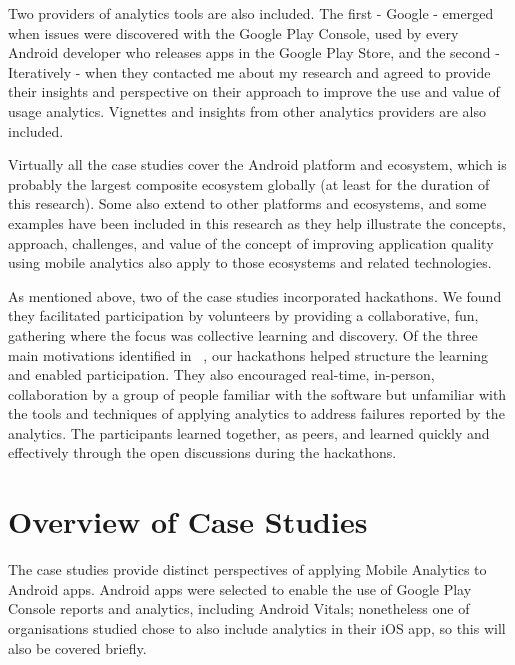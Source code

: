 Two providers of analytics tools are also included. The first - Google - emerged when issues were discovered with the Google Play Console, used by every Android developer who releases apps in the Google Play Store, and the second - Iteratively - when they contacted me about my research and agreed to provide their insights and perspective on their approach to improve the use and value of usage analytics. Vignettes and insights from other analytics providers are also included. 

Virtually all the case studies cover the Android platform and ecosystem, which is probably the largest composite ecosystem globally (at least for the duration of this research). Some also extend to other platforms and ecosystems, and some examples have been included in this research as they help illustrate the concepts, approach, challenges, and value of the concept of improving application quality using mobile analytics also apply to those ecosystems and related technologies.

As mentioned above, two of the case studies incorporated hackathons. We found they facilitated participation by volunteers by providing a collaborative, fun, gathering where the focus was collective learning and discovery. Of the three main motivations identified in ~\citep{olesen2020_10_years_of_hackathons}, our hackathons helped structure the learning and enabled participation. They also encouraged real-time, in-person, collaboration by a group of people familiar with the software but unfamiliar with the tools and techniques of applying analytics to address failures reported by the analytics. The participants learned together, as peers, and learned quickly and effectively through the open discussions during the hackathons.



\section{Overview of Case Studies}
\label{section-overview-of-case-studies}

The case studies provide %
distinct perspectives of applying Mobile Analytics to Android apps. Android apps were selected to enable the use of Google Play Console reports and analytics, including Android Vitals; nonetheless one of organisations studied chose to also include analytics in their iOS app, so this will also be covered briefly.

